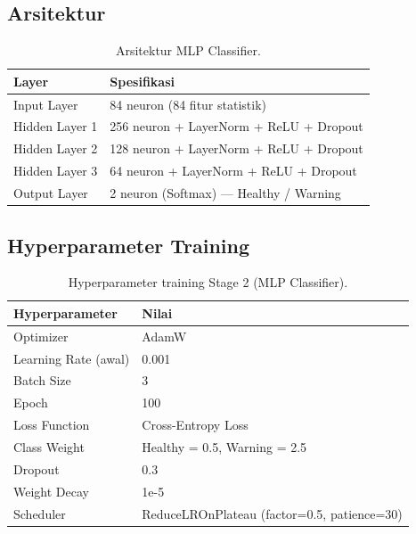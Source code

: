 \documentclass[11pt,a4paper]{article}
\begin{document}
\subsection{Arsitektur}
\begin{table}[H]
    \centering
    \caption{Arsitektur MLP Classifier.}
    \begin{tabular}{ll}
        \toprule
        \textbf{Layer} & \textbf{Spesifikasi} \\
        \midrule
        Input Layer   & 84 neuron (84 fitur statistik) \\
        Hidden Layer 1 & 256 neuron + LayerNorm + ReLU + Dropout \\
        Hidden Layer 2 & 128 neuron + LayerNorm + ReLU + Dropout \\
        Hidden Layer 3 & 64 neuron + LayerNorm + ReLU + Dropout \\
        Output Layer  & 2 neuron (Softmax) — Healthy / Warning \\
        \bottomrule
    \end{tabular}
\end{table}

\subsection{Hyperparameter Training}
\begin{table}[H]
    \centering
    \caption{Hyperparameter training Stage 2 (MLP Classifier).}
    \begin{tabular}{ll}
        \toprule
        \textbf{Hyperparameter} & \textbf{Nilai} \\
        \midrule
        Optimizer & AdamW \\
        Learning Rate (awal) & 0.001 \\
        Batch Size & 3 \\
        Epoch & 100 \\
        Loss Function & Cross-Entropy Loss \\
        Class Weight & Healthy = 0.5, Warning = 2.5 \\
        Dropout & 0.3 \\
        Weight Decay & 1e-5 \\
        Scheduler & ReduceLROnPlateau (factor=0.5, patience=30) \\
        \bottomrule
    \end{tabular}
\end{table}
\end{document}
